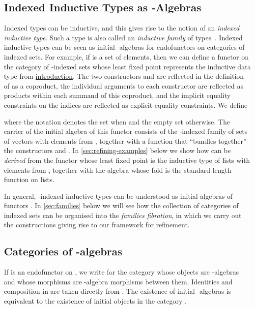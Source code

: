 \documentclass{LMCS}
\begin{document}
\subsection{Indexed Inductive Types as
  -Algebras}\label{sec:indexed-ind-types}  

Indexed types can be inductive, and this gives rise to the notion of
an {\em indexed inductive type}. Such a type is also called an {\em
  inductive family} of types~\cite{dybjer94inductive}. Indexed
inductive types can be seen as initial -algebras for endofunctors
 on categories of indexed sets. For example, if  is a set of
elements, then we can define a functor  on the
category of -indexed sets whose least fixed point
represents the inductive data type  from
\hyperref[sec:introduction]{introduction}. The two constructors
 and  are reflected in the definition of
 as a coproduct, the individual arguments to
each constructor are reflected as products within each summand of this
coproduct, and the implicit equality constraints on the indices are
reflected as explicit equality constraints. We define

where the notation  denotes the set  when
 and the empty set otherwise.  The carrier of the initial
algebra  of this functor
consists of the -indexed family  of sets of vectors with elements from ,
together with a function  that ``bundles
together'' the constructors  and . In
\autoref{sec:refining-examples} below we show how
 can be \emph{derived} from the functor
 whose least fixed point is the inductive type of
lists with elements from , together with the algebra
 whose fold is the standard length function on
lists.

In general, -indexed inductive types can be understood as initial
algebras of functors . In
\autoref{sec:families} below we will see how the collection of
categories of indexed sets can be organised into the \emph{families
  fibration}, in which we carry out the constructions giving rise to
our framework for refinement.

\subsection{Categories of -algebras}

If  is an endofunctor on , we write  for the
category whose objects are -algebras and whose morphisms are
-algebra morphisms between them. Identities and composition in
 are taken directly from . The existence of initial
-algebras is equivalent to the existence of initial objects in the
category .
\end{document}
